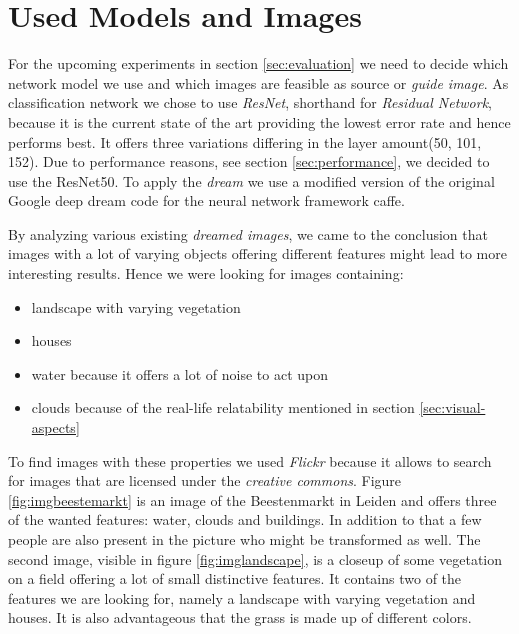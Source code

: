 \section{Used Models and Images}
\label{sec:data}
For the upcoming experiments in section \ref{sec:evaluation} we need to decide which network model we use and which images are feasible as source or \emph{guide image}.
As classification network we chose to use \emph{ResNet}\cite{he2016deep}, shorthand for \emph{Residual Network}, because it is the current state of the art providing the lowest error rate and hence performs best.\cite{cnnComparison}
It offers three variations differing in the layer amount(50, 101, 152).
Due to performance reasons, see section \ref{sec:performance}, we decided to use the ResNet50.
To apply the \emph{dream} we use a modified version of the original Google deep dream code\cite{deep-dream-github} for the neural network framework caffe\cite{jia2014caffe}.

By analyzing various existing \emph{dreamed images}, we came to the conclusion that images with a lot of varying objects offering different features might lead to more interesting results.
Hence we were looking for images containing: 
\begin{itemize}
	\item landscape with varying vegetation
	\item houses
	\item water because it offers a lot of noise to act upon
	\item clouds because of the real-life relatability mentioned in section \ref{sec:visual-aspects}
\end{itemize}

To find images with these properties we used \emph{Flickr} because it allows to search for images that are licensed under the \emph{creative commons}.
Figure \ref{fig:imgbeestemarkt} is an image of the Beestenmarkt in Leiden and offers three of the wanted features: water, clouds and buildings.
In addition to that a few people are also present in the picture who might be transformed as well.
The second image, visible in figure \ref{fig:imglandscape}, is a closeup of some vegetation on a field offering a lot of small distinctive features.
It contains two of the features we are looking for, namely a landscape with varying vegetation and houses.
It is also advantageous that the grass is made up of different colors.



